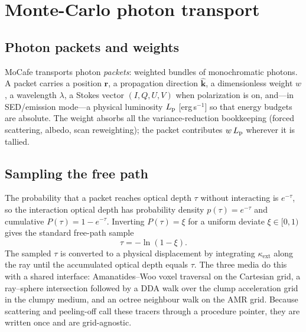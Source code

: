 \documentclass[english,a4paper]{kiseon_memo}
\newcommand{\kext}{\kappa_{\mathrm{ext}}}
\newcommand{\khat}{\hat{\mathbf k}}
\newcommand{\rvec}{\mathbf r}
\begin{document}
\section{Monte-Carlo photon transport}

\subsection{Photon packets and weights}
MoCafe transports photon \emph{packets}: weighted bundles of monochromatic
photons.  A packet carries a position $\rvec$, a propagation direction $\khat$,
a dimensionless weight $w$, a wavelength $\lambda$, a Stokes vector
$(I,Q,U,V)$ when polarization is on, and---in SED/emission mode---a physical
luminosity $L_{\rm p}$ [erg\,s$^{-1}$] so that energy budgets are absolute.  The
weight absorbs all the variance-reduction bookkeeping (forced scattering,
albedo, scan reweighting); the packet contributes $w\,L_{\rm p}$ wherever it is
tallied.

\subsection{Sampling the free path}
The probability that a packet reaches optical depth $\tau$ without interacting is
$e^{-\tau}$, so the interaction optical depth has probability density
$p(\tau)=e^{-\tau}$ and cumulative $P(\tau)=1-e^{-\tau}$.  Inverting
$P(\tau)=\xi$ for a uniform deviate $\xi\in[0,1)$ gives the standard free-path
sample
\begin{equation}
  \tau = -\ln(1-\xi).
  \label{eq:freepath}
\end{equation}
The sampled $\tau$ is converted to a physical displacement by integrating
$\kext$ along the ray until the accumulated optical depth equals $\tau$.  The
three media do this with a shared interface: Amanatides--Woo voxel traversal on
the Cartesian grid, a ray--sphere intersection followed by a DDA walk over the
clump acceleration grid in the clumpy medium, and an octree neighbour walk on the
AMR grid.  Because scattering and peeling-off call these tracers through a
procedure pointer, they are written once and are grid-agnostic.
\end{document}

